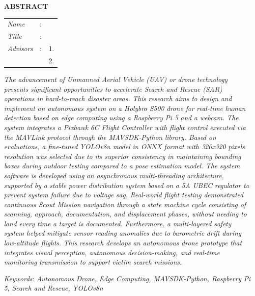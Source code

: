 \begin{center}
	\large\textbf{ABSTRACT}
\end{center}


\vspace{2ex}

\begingroup
\setlength{\tabcolsep}{0pt}

\noindent
\begin{tabularx}{\textwidth}{l >{\centering}m{3em} X}
	\emph{Name}     & : & \name{}         \\
	
	\emph{Title}    & : & \engtatitle{}   \\
	
	\emph{Advisors} & : & 1. \advisor{}   \\
	&   & 2. \coadvisor{} \\
\end{tabularx}
\endgroup

\emph{
	The advancement of Unmanned Aerial Vehicle (UAV) or drone technology presents significant opportunities to accelerate Search and Rescue (SAR) operations in hard-to-reach disaster areas. This research aims to design and implement an autonomous system on a Holybro S500 drone for real-time human detection based on edge computing using a Raspberry Pi 5 and a webcam. The system integrates a Pixhawk 6C Flight Controller with flight control executed via the MAVLink protocol through the MAVSDK-Python library. Based on evaluations, a fine-tuned YOLOv8n model in ONNX format with 320x320 pixels resolution was selected due to its superior consistency in maintaining bounding boxes during outdoor testing compared to a pose estimation model. The system software is developed using an asynchronous multi-threading architecture, supported by a stable power distribution system based on a 5A UBEC regulator to prevent system failure due to voltage sag. Real-world flight testing demonstrated continuous Scout Mission navigation through a state machine cycle consisting of scanning, approach, documentation, and displacement phases, without needing to land every time a target is documented. Furthermore, a multi-layered safety system helped mitigate sensor reading anomalies due to barometric drift during low-altitude flights. This research develops an autonomous drone prototype that integrates visual perception, autonomous decision-making, and real-time monitoring transmission to support victim search missions.}

\emph{Keywords}: \emph{Autonomous Drone, Edge Computing, MAVSDK-Python, Raspberry Pi 5, Search and Rescue, YOLOv8n}